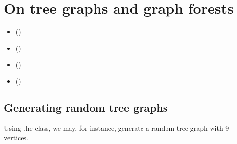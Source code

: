 \documentclass[a4paper,10pt,english]{sphinxhowto}
\begin{document}
\section{On tree graphs and graph forests}
\label{\detokenize{tutorial:on-tree-graphs-and-graph-forests}}\label{\detokenize{tutorial:trees-tutorial-label}}
\begin{sphinxShadowBox}
\begin{itemize}
\item {} 
\label{\detokenize{tutorial:id234}}{\hyperref[\detokenize{tutorial:generating-random-tree-graphs}]{}} ()

\item {} 
\label{\detokenize{tutorial:id235}}{\hyperref[\detokenize{tutorial:recognizing-tree-graphs}]{}} ()

\item {} 
\label{\detokenize{tutorial:id236}}{\hyperref[\detokenize{tutorial:spanning-trees-and-forests}]{}} ()

\item {} 
\label{\detokenize{tutorial:id237}}{\hyperref[\detokenize{tutorial:maximum-determined-spanning-forests}]{}} ()

\end{itemize}
\end{sphinxShadowBox}


\subsection{Generating random tree graphs}
\label{\detokenize{tutorial:generating-random-tree-graphs}}
Using the  class, we may, for instance, generate a random tree graph with 9 vertices.
\end{document}
